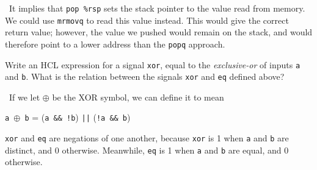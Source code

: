 \documentclass[12pt]{article}
\newenvironment{ex}[2][Exercise]{\begin{trivlist}
		\item[\hskip \labelsep {\bfseries #1}\hskip \labelsep {\bfseries #2.}]}{\end{trivlist}}
\newenvironment{sol}[1][Solution]{\begin{trivlist}
		\item[\hskip \labelsep {\bfseries #1:}]}{\end{trivlist}}
\begin{document}
\begin{sol}
	\
	It implies that \texttt{pop \%rsp} sets the stack pointer to the
	value read from memory. We could use \texttt{mrmovq} to read this
	value instead. This would give the correct return value; however,
	the value we pushed would remain on the stack, and would therefore
	point to a lower address than the \texttt{popq} approach.
\end{sol}

\begin{ex}{4.9}
	Write an HCL expression for a signal \texttt{xor}, equal to the
	\emph{exclusive-or} of inputs \texttt{a} and \texttt{b}. What is
	the relation between the signals \texttt{xor} and \texttt{eq} defined
	above?
\end{ex}

\begin{sol}
	\
	If we let $\oplus$ be the XOR symbol, we can define it to mean
	\begin{center}
	\texttt{a $\oplus$ b} = (\texttt{a \&\& !b}) \texttt{||} (\texttt{!a \&\& b})	
	\end{center}
	\texttt{xor} and \texttt{eq} are negations of one another, because
	\texttt{xor} is 1 when \texttt{a} and \texttt{b} are distinct, and 0
	otherwise. Meanwhile, \texttt{eq} is 1 when \texttt{a} and \texttt{b}
	are equal, and 0 otherwise.
\end{sol}
\end{document}
